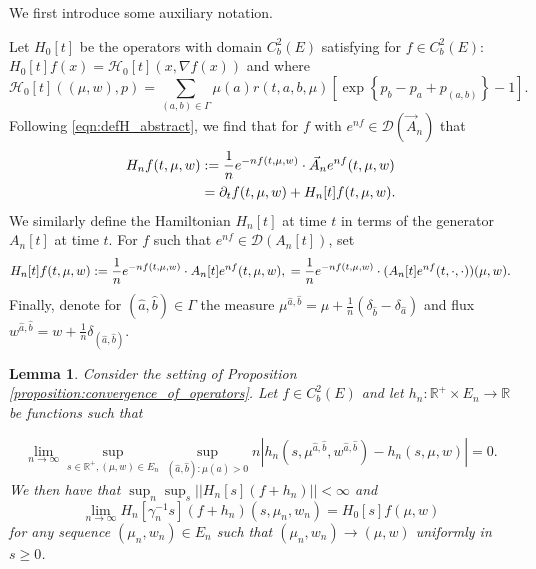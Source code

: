 \documentclass[a4paper]{article}
\newcommand{\cD}{\mathcal{D}}
\newcommand{\cH}{\mathcal{H}}
\newcommand{\bR}{\mathbb{R}}
\newcommand{\vn}[1]{\left| \! \left| #1\right| \! \right|}
\numberwithin{equation}{section}
\newtheorem{lemma}[theorem]{Lemma}
\theoremstyle{definition}
\begin{document}
We first introduce some auxiliary notation.



Let $H_0[t]$ be the operators with domain $C^2_b(E)$ satisfying for $f \in C_b^2(E)$: $H_0[t]f(x) = \cH_0[t](x,\nabla f(x))$ and where
\begin{equation} 
	\cH_0[t]((\mu,w),p) = \sum_{(a,b) \in \Gamma} \mu(a) r(t,a,b,\mu)\left[\exp\left\{p_b - p _a + p_{(a,b)} \right\} - 1 \right]. \label{eqn:Hamiltonian_proof_periodic_0version}
\end{equation}
Following \eqref{eqn:defH_abstract}, we find that for $f$ with $e^{nf} \in \cD(\vec{A}_n)$ that
\begin{align}
	H_n f(t,\mu,w) & := \frac{1}{n} e^{-nf(t,\mu,w)} \cdot \vec{A}_n e^{nf} (t,\mu,w) \notag \\
	& = \partial_t f(t,\mu,w) + H_n[t] f(t,\mu,w). \label{eqn:separation_H_n}
\end{align}
We similarly define the Hamiltonian $H_n[t]$ at time $t$ in terms of the generator $A_n[t]$ at time $t$. For $f$ such that $e^{nf} \in \cD(A_n[t])$, set
\begin{equation*}
	H_{n}[t] f(t,\mu,w)  := \frac{1}{n} e^{-nf(t,\mu,w)} \cdot A_n[t] e^{nf} (t,\mu,w), \notag \\
	= \frac{1}{n} e^{-nf(t,\mu,w)} \cdot (A_n[t] e^{nf} (t,\cdot,\cdot))(\mu,w).
\end{equation*}
Finally, denote for $(\hat{a},\hat{b}) \in \Gamma$ the measure $\mu^{\hat{a},\hat{b}} = \mu + \frac{1}{n}\left(\delta_{\hat{b}} - \delta_{\hat{a}}\right)$ and flux $w^{\hat{a},\hat{b}} = w + \frac{1}{n} \delta_{(\hat{a},\hat{b})}$. 




\begin{lemma} \label{lemma:convergence_of_operators_modulo_time_period}
	Consider the setting of Proposition \ref{proposition:convergence_of_operators}. Let $f \in C_b^2(E)$ and let $h_n : \bR^+ \times E_n \rightarrow \bR$ be functions such that
	
	
	
	\begin{equation} \label{eqn:assumption_hn}
		\lim_{n \rightarrow \infty} \sup_{s \in \bR^+, (\mu,w) \in E_n} \sup_{(\hat{a},\hat{b}): \mu(\hat{a}) > 0}  n \left| h_n(s,\mu^{\hat{a},\hat{b}},w^{\hat{a},\hat{b}}) - h_n(s,\mu,w)  \right| = 0.
	\end{equation}
	We then have that $\sup_n \sup_s \vn{H_n[s] (f + h_n) } < \infty$ and
	\begin{equation} \label{eqn:conv_time_dependent_H}
		\lim_{n \rightarrow \infty}  H_n[\gamma_n^{-1} s](f  + h_n)(s,\mu_n,w_n) = H_0[s] f(\mu,w)
	\end{equation} 
	for any sequence  $(\mu_n,w_n) \in E_n$ such that $(\mu_n,w_n) \rightarrow (\mu,w)$ uniformly in $s \geq 0$. 
\end{lemma}
\end{document}
